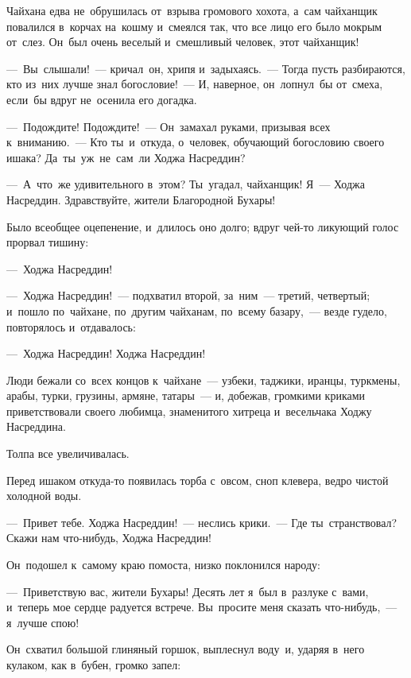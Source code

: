 \documentclass[12pt,a4paper]{book}
\begin{document}
Чайхана едва не~обрушилась от~взрыва громового хохота, а~сам чайханщик повалился в~корчах на~кошму и~смеялся так, что все лицо его было мокрым от~слез. Он~был очень веселый и~смешливый человек, этот чайханщик!

—~Вы~слышали!~— кричал~он, хрипя и~задыхаясь.~— Тогда пусть разбираются, кто из~них лучше знал богословие!~— И, наверное, он~лопнул~бы от~смеха, если~бы вдруг не~осенила его догадка.

—~Подождите! Подождите!~— Он~замахал руками, призывая всех к~вниманию.~— Кто ты~и~откуда, о~человек, обучающий богословию своего ишака? Да~ты~уж~не~сам~ли Ходжа Насреддин?

—~А~что~же удивительного в~этом? Ты~угадал, чайханщик! Я~— Ходжа Насреддин. Здравствуйте, жители Благородной Бухары!

Было всеобщее оцепенение, и~длилось оно долго; вдруг чей-то ликующий голос прорвал тишину:

—~Ходжа Насреддин!

—~Ходжа Насреддин!~— подхватил второй, за~ним~— третий, четвертый; и~пошло по~чайхане, по~другим чайханам, по~всему базару,~— везде гудело, повторялось и~отдавалось:

—~Ходжа Насреддин! Ходжа Насреддин!

Люди бежали со~всех концов к~чайхане~— узбеки, таджики, иранцы, туркмены, арабы, турки, грузины, армяне, татары~— и, добежав, громкими криками приветствовали своего любимца, знаменитого хитреца и~весельчака Ходжу Насреддина.

Толпа все увеличивалась.

Перед ишаком откуда-то появилась торба с~овсом, сноп клевера, ведро чистой холодной воды.

—~Привет тебе. Ходжа Насреддин!~— неслись крики.~— Где ты~странствовал? Скажи нам что-нибудь, Ходжа Насреддин!

Он~подошел к~самому краю помоста, низко поклонился народу:

—~Приветствую вас, жители Бухары! Десять лет я~был в~разлуке с~вами, и~теперь мое сердце радуется встрече. Вы~просите меня сказать что-нибудь,~— я~лучше спою!

Он~схватил большой глиняный горшок, выплеснул воду~и, ударяя в~него кулаком, как в~бубен, громко запел:
\end{document}
